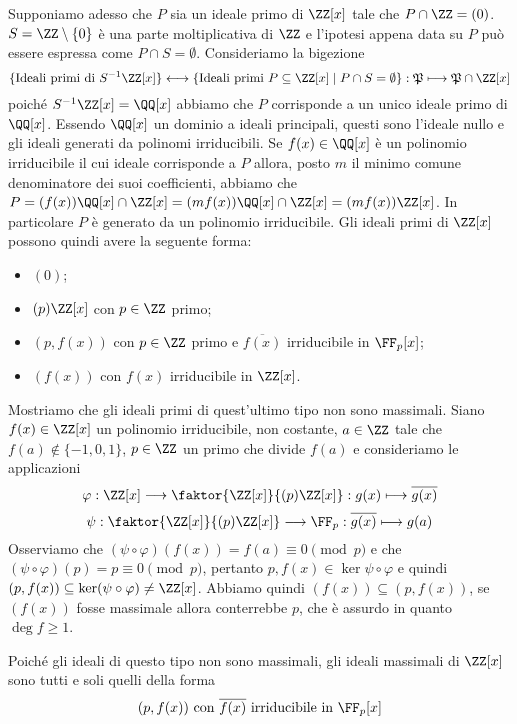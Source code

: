 \documentclass[11pt]{scrartcl}
\begin{document}
Supponiamo adesso che $P$ sia un ideale primo di $\ZZ[x]$ tale che 
$P \cap \ZZ = (0)$. $S = \ZZ\setminus \{0\}$ è una parte moltiplicativa di 
$\ZZ$ e l'ipotesi appena data su $P$ può essere espressa come $P \cap S = \emptyset$.
Consideriamo la bigezione 
\[
    \{\text{Ideali primi di }S^{-1}\ZZ[x]\}\longleftrightarrow 
    \{\text{Ideali primi } P\subseteq \ZZ[x] \mid P\cap S = \emptyset\}: 
    \mathfrak{P}\longmapsto \mathfrak{P}\cap\ZZ[x]
\]
poiché $S^{-1}\ZZ[x] = \QQ[x]$ abbiamo che $P$ corrisponde a un unico ideale
primo di $\QQ[x]$. Essendo $\QQ[x]$ un dominio a ideali principali, questi sono
l'ideale nullo e gli ideali generati da polinomi irriducibili. Se $f(x)\in \QQ[x]$
è un polinomio irriducibile il cui ideale corrisponde a $P$ allora, posto 
$m$ il minimo comune denominatore dei suoi coefficienti, abbiamo che 
$P = (f(x))\QQ[x] \cap \ZZ[x] = (mf(x))\QQ[x]\cap\ZZ[x] = (mf(x))\ZZ[x]$. 
In particolare $P$ è generato da un polinomio irriducibile.
Gli ideali primi di $\ZZ[x]$ possono quindi avere la seguente forma:
\begin{itemize}
    \item $(0)$;
    \item $(p)\ZZ[x]$ con $p \in \ZZ$ primo;
    \item $(p, f(x))$ con $p \in \ZZ$ primo e $\overline{f(x)}$ irriducibile
    in $\FF_p[x]$;
    \item $(f(x))$ con $f(x)$ irriducibile in $\ZZ[x]$.
\end{itemize}

Mostriamo che gli ideali primi di quest'ultimo tipo non sono massimali.\newline
Siano $f(x) \in \ZZ[x]$ un polinomio irriducibile, non costante,
$a \in \ZZ$ tale che $f(a) \notin\{-1, 0, 1\}$, $p \in \ZZ$ un primo che 
divide $f(a)$ e consideriamo le applicazioni
\[
    \varphi: \ZZ[x]\longrightarrow \faktor{\ZZ[x]}{(p)\ZZ[x]}: 
    g(x)\longmapsto \overline{g(x)}
\] 
\[
    \psi: \faktor{\ZZ[x]}{(p)\ZZ[x]}\longrightarrow \FF_p: 
    \overline{g(x)}\longmapsto g(a)
\]
Osserviamo che $(\psi\circ\varphi)(f(x)) = f(a) \equiv 0 \pmod{p}$ e che 
$(\psi\circ\varphi)(p) = p \equiv 0 \pmod{p}$, pertanto $p, f(x) \in 
\ker{\psi\circ\varphi}$ e quindi $(p, f(x)) \subseteq \ker(\psi\circ \varphi) \neq \ZZ[x]$.
Abbiamo quindi $(f(x)) \subseteq (p, f(x))$, se $(f(x))$ fosse massimale allora
conterrebbe $p$, che è assurdo in quanto $\deg f \geq 1$.

Poiché gli ideali di questo tipo non sono massimali, gli ideali massimali di
$\ZZ[x]$ sono tutti e soli quelli della forma
\[
    (p, f(x)) \text{ con }\overline{f(x)} \text{ irriducibile in }\FF_p[x]
\]
\end{document}
